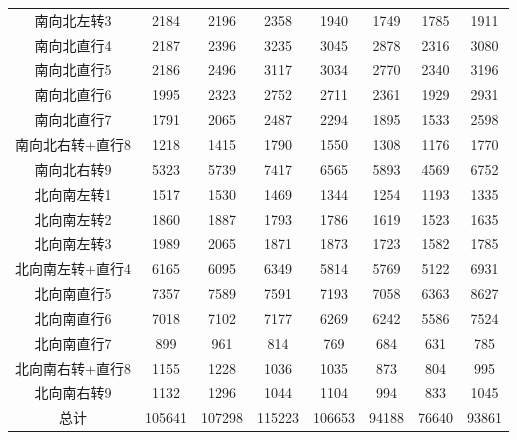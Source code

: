 \documentclass[UTF8]{article}
\begin{document}
\begin{table}[H]
{\begin{tabular}{cccccccc}
            南向北左转3	&2184	&2196	&2358	&1940	&1749	&1785	&1911\\
           
            南向北直行4	&2187	&2396	&3235	&3045	&2878	&2316	&3080\\
           
            南向北直行5	&2186	&2496	&3117	&3034	&2770	&2340	&3196\\
           
            南向北直行6	&1995	&2323	&2752	&2711	&2361	&1929	&2931\\
           
            南向北直行7	&1791	&2065	&2487	&2294	&1895	&1533	&2598\\
           
            南向北右转+直行8	&1218	&1415	&1790	&1550	&1308	&1176	&1770\\
                       
            南向北右转9	&5323	&5739	&7417	&6565	&5893	&4569	&6752\\
           
            北向南左转1	&1517	&1530	&1469	&1344	&1254	&1193	&1335\\
           
            北向南左转2	&1860	&1887	&1793	&1786	&1619	&1523	&1635\\
           
            北向南左转3	&1989	&2065	&1871	&1873	&1723	&1582	&1785\\
           
            北向南左转+直行4	&6165	&6095	&6349	&5814	&5769	&5122	&6931\\
           
            北向南直行5	&7357	&7589	&7591	&7193	&7058	&6363	&8627\\
           
            北向南直行6	&7018	&7102	&7177	&6269	&6242	&5586	&7524\\
           
            北向南直行7	&899	&961	&814	&769	&684	&631	&785\\
           
            北向南右转+直行8	&1155	&1228	&1036	&1035	&873	&804	&995\\
           
            北向南右转9	&1132	&1296	&1044	&1104	&994	&833	&1045\\
           
            总计	&105641	&107298	&115223	&106653	&94188	&76640	&93861\\
           \hline
            
        \end{tabular}}
    \end{table}
\end{document}
